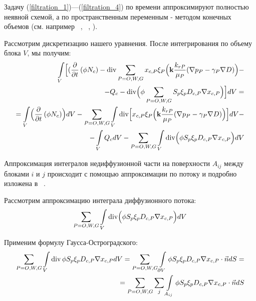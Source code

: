 \documentclass[12pt,a4paper]{article}
\def\Div{\mathop{\rm div}\nolimits}
\begin{document}
Задачу (\ref{filtration_1})---(\ref{filtration_4}) по времени аппроксимируют полностью неявной схемой, а по пространственным переменным  - методом конечных объемов (см. например ~\cite{Aziz}, ~\cite{Chen}, \cite{BogachevMelnichenko}).



Рассмотрим дискретизацию нашего уравнения.
После интегрирования по объему блока $V$, мы получим:
\begin{eqnarray}
  \int\limits_{V}\Bigl[(\dfrac{\partial}{\partial t} \left(\phi N_c\right) -
   \Div\sum\limits_{P = O, W, G} x_{c,P} \xi_P \Bigl({\bf k} \dfrac{k_{rP}}{\mu_P}(\nabla p_P - \gamma_P \nabla D)\Bigr) -\nonumber \\
   - Q_c - \Div\Bigl({\phi \sum\limits_{P = O, W, G}{S_p\xi_pD_{c,P}\nabla x_{c,P}}}\Bigr)\Bigr]d V = \nonumber \\ 
   =\int\limits_{V}\Bigl(\dfrac{\partial}{\partial t} \left(\phi N_c\right)\Bigr)d V -  \sum\limits_{P = O, W, G}\int\limits_{V} \Div\Bigl[ x_{c,P} \xi_P \Bigl({\bf k} \dfrac{k_{rP}}{\mu_P}(\nabla p_P - \gamma_P \nabla D)\Bigr)\Bigr]d V - \nonumber \\
   - \int\limits_{V}Q_c d V -  \sum\limits_{P = O, W, G}{\int\limits_{V}\Div\Bigl({\phi S_p\xi_pD_{c,P}\nabla x_{c,P}}\Bigr)d V} \nonumber
\end{eqnarray}


Аппроксимация интегралов недиффузионной части на поверхности $A_{ij}$ между блоками $i$ и $j$ происходит с помощью аппроксимации по потоку \cite{Saad} и подробно изложена в ~\cite {BogachevMelnichenko}.

Рассмотрим аппроксимацию интеграла диффузионного потока:
$$\sum\limits_{P = O, W, G}{\int\limits_{V}\Div\Bigl({\phi S_p\xi_pD_{c,P}\nabla x_{c,P}}\Bigr)d V}$$

Применим формулу Гаусса-Остроградского:
\begin{eqnarray}
\sum\limits_{P = O, W, G}{\int\limits_{V}\Div{\phi S_p\xi_pD_{c,P}\nabla x_{c,P}}d V}=\sum\limits_{P = O, W, G}{\int\limits_{\partial V}\phi S_p\xi_pD_{c,P}\nabla x_{c,P}\cdot\vec{n}dS} =\nonumber \\ 
= \sum\limits_{P = O, W, G}{\sum\limits_{j}{\int\limits_{A_{ij}}\phi S_p\xi_pD_{c,P}\nabla x_{c,P}\cdot\vec{n}dS}} \nonumber
\end{eqnarray}
\end{document}

